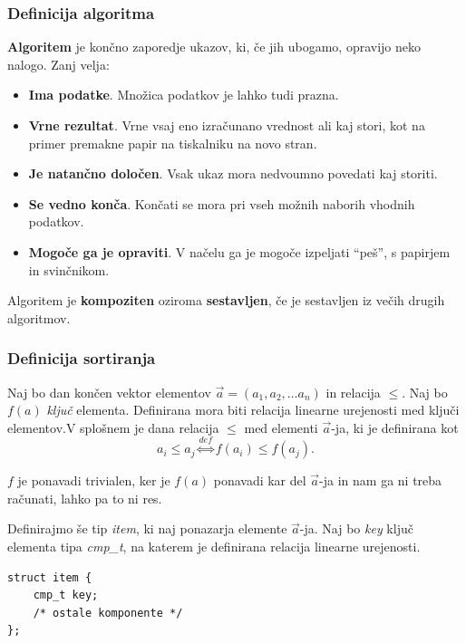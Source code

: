 \documentclass[a4paper,oneside]{article}
\begin{document}
\subsubsection{Definicija algoritma}

\textbf{Algoritem} je končno zaporedje ukazov, ki, če jih ubogamo, opravijo neko nalogo.
Zanj velja:
\begin{itemize}
  \item \textbf{Ima podatke}. Množica podatkov je lahko tudi prazna.
  \item \textbf{Vrne rezultat}. Vrne vsaj eno izračunano vrednost ali kaj stori, kot na primer
    premakne papir na tiskalniku na novo stran.
  \item \textbf{Je natančno določen}. Vsak ukaz mora nedvoumno povedati kaj storiti.
  \item \textbf{Se vedno konča}. Končati se mora pri vseh možnih naborih vhodnih podatkov.
  \item \textbf{Mogoče ga je opraviti}. V načelu ga je mogoče izpeljati ``peš'', s papirjem in
    svinčnikom.
\end{itemize}


\begin{definicija}
  Algoritem je \textbf{kompoziten} oziroma \textbf{sestavljen}, če je sestavljen iz večih
  drugih algoritmov.
\end{definicija}


\subsubsection{Definicija sortiranja}
Naj bo dan končen vektor elementov $\vec{a} = \left(a_1, a_2, \ldots a_n \right)$ in relacija $\leq$.
Naj bo $f(a)$ \emph{ključ} elementa. Definirana mora biti relacija linearne urejenosti med 
ključi elementov.V splošnem je dana relacija $\leq$ med elementi $\vec{a}$-ja, ki je definirana kot 
\[a_i \leq a_j \overset{def}{\Longleftrightarrow} f(a_i) \leq f(a_j). \]

$f$ je ponavadi trivialen, ker je $f(a)$ ponavadi kar del $\vec{a}$-ja in nam ga ni treba
računati, lahko pa to ni res. 

Definirajmo še tip \emph{item}, ki naj ponazarja elemente $\vec{a}$-ja. Naj bo \emph{key}
ključ elementa tipa \emph{cmp\_t}, na katerem je definirana relacija linearne urejenosti.

\begin{lstlisting}
struct item {
    cmp_t key;
    /* ostale komponente */
};
\end{lstlisting}
\end{document}

